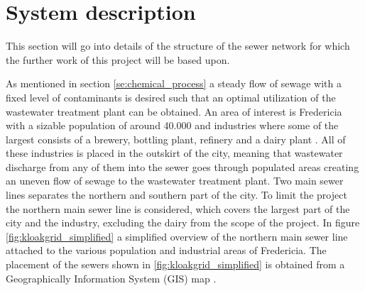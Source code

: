 \chapter{System description}\label{se:system_description}
This section will go into details of the structure of the sewer network for which the further work of this project will be based upon.

As mentioned in section \ref{se:chemical_process} a steady flow of sewage with a fixed level of contaminants is desired such that an optimal utilization of the wastewater treatment plant can be obtained. An area of interest is Fredericia with a sizable population of around 40.000 and industries where some of the largest consists of a brewery, bottling plant, refinery and a dairy plant \cite{Statistic_Denmark}. All of these industries is placed in the outskirt of the city, meaning that wastewater discharge from any of them into the sewer goes through populated areas creating an uneven flow of sewage to the wastewater treatment plant. Two main sewer lines separates the northern and southern part of the city. To limit the project the northern main sewer line is considered, which covers the largest part of the city and the industry, excluding the dairy from the scope of the project. In figure \ref{fig:kloakgrid_simplified} a simplified overview of the northern main sewer line attached to the various population and industrial areas of Fredericia. The placement of the sewers shown in \ref{fig:kloakgrid_simplified} is obtained from a Geographically Information System (GIS) map \cite{GIS_kort}.     

